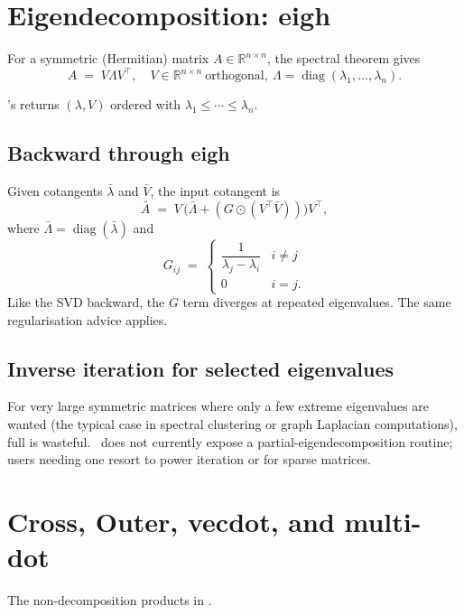 \section{Eigendecomposition: eigh}
\label{sec:linalg:eigh_detail}

For a symmetric (Hermitian) matrix $A \in \mathbb{R}^{n \times
n}$, the spectral theorem gives
\[
A \;=\; V \Lambda V^\top, \quad
V \in \mathbb{R}^{n \times n}\ \text{orthogonal},\
\Lambda = \operatorname{diag}(\lambda_1, \ldots, \lambda_n).
\]

\Lucid's  returns $(\lambda, V)$ ordered with
$\lambda_1 \leq \cdots \leq \lambda_n$.

\subsection{Backward through eigh}
\label{ssec:linalg:eigh_back}

Given cotangents $\bar \lambda$ and $\bar V$, the input cotangent
is
\[
\bar A \;=\; V\,\bigl(\bar\Lambda + (G \odot (V^\top \bar V))\bigr) V^\top,
\]
where $\bar\Lambda = \operatorname{diag}(\bar\lambda)$ and
\[
G_{ij} \;=\; \begin{cases}
\dfrac{1}{\lambda_j - \lambda_i} & i \neq j \\
0 & i = j.
\end{cases}
\]
Like the SVD backward, the $G$ term diverges at repeated
eigenvalues. The same regularisation advice applies.

\subsection{Inverse iteration for selected eigenvalues}
\label{ssec:linalg:inverse_iteration}

For very large symmetric matrices where only a few extreme
eigenvalues are wanted (the typical case in spectral clustering
or graph Laplacian computations), full  is wasteful.
\Lucid\ does not currently expose a partial-eigendecomposition
routine; users needing one resort to power iteration or
 for sparse matrices.

\section{Cross, Outer, vecdot, and multi-dot}
\label{sec:linalg:products}

The non-decomposition products in .

